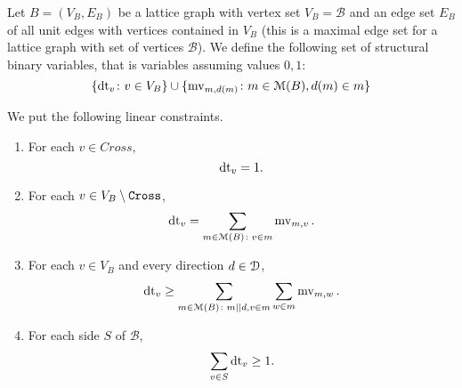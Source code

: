 \begin{definition}  
  Let $B = (V_B, E_B)$ be a lattice graph with vertex set $V_B = \mathcal{B}$ and an edge set $E_B$
    of all unit edges with vertices contained in $V_B$ (this is a maximal edge set for a lattice graph with set of vertices $\mathcal{B}$).
  We define the following set of structural binary variables, that is variables assuming values $0, 1$:
  \[
  \{ \operatorname{dt}_v \colon v \in V_B \} \cup \{ \operatorname{mv}_{m, d(m)} \colon m \in \mathcal{M}(B), d(m) \in m \}
  \]
  
  We put the following linear constraints.
  
  \begin{enumerate}
  \item  For each $v \in Cross$,
  \[
    \operatorname{dt}_v = 1.
  \]
  \item For each $v \in V_B \setminus \texttt{Cross}$, 
  \[ 
    \operatorname{dt}_v = \sum_{m \in \mathcal{M}(B) \colon v \in m} \operatorname{mv}_{m, v}.
  \]
  \item For each $v \in V_B$ and every direction $d \in \mathcal{D}$,
  \[
  	\operatorname{dt}_v \geq \sum_{m \in \mathcal{M}(B) \colon m || d, v \in m} \sum_{w \in m} \operatorname{mv}_{m, w}.
  \]
  \item For each side $S$ of $\mathcal{B}$,
  \[
  \sum_{v \in S} \operatorname{dt}_v \geq 1.
  \]
  \end{enumerate}
  \label{def:mip}
\end{definition}

